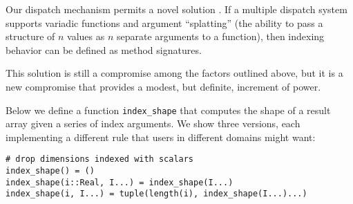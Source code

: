 \iffalse
In a language with built-in multidimensional arrays, the compiler will
analyze indexing expressions and determine an answer using hard-coded
logic.
However, this approach is not satisfying: we would rather
implement the behavior in libraries, so that different kinds of arrays
may be defined, or so that rules of similar complexity may be
defined for other kinds of objects.
In fact different domains want different things.
Working with images, each dimension might be quite different, e.g. representing
time, space, or color, so you don't want to drop or rearrange dimensions very often.
Using compile time abstracton (templates) provides better performance, but
such libraries tend to be difficult to write (and read), and the full
complement of indexing behavior expected by technical users strains the
capabilities of such systems.
\fi

Our dispatch mechanism permits a novel solution \cite{Bezanson2014}.
If a multiple dispatch
system supports variadic functions and argument ``splatting'' (the ability
to pass a structure of $n$ values as $n$ separate arguments to a function),
then indexing behavior can be defined as method signatures.

This solution is still a compromise among the factors outlined above,
but it is a new compromise that provides a modest, but definite,
increment of power.

Below we define a function \texttt{index\_shape} that computes the
shape of a result array given a series of index arguments. We show
three versions, each implementing a different rule that users in
different domains might want:


\begin{singlespace}
\begin{verbatim}
# drop dimensions indexed with scalars
index_shape() = ()
index_shape(i::Real, I...) = index_shape(I...)
index_shape(i, I...) = tuple(length(i), index_shape(I...)...)
\end{verbatim}
\end{singlespace}

